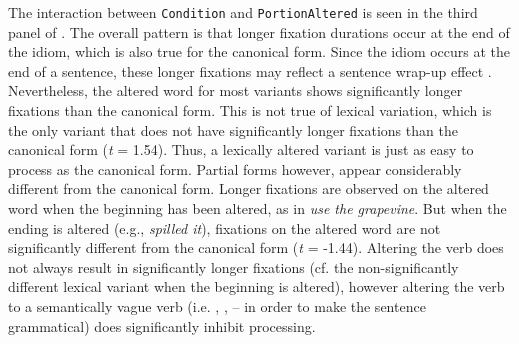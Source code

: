 \documentclass[output=paper,modfonts,nonflat]{langsci/langscibook}
\begin{document}
The interaction between \texttt{Condition} and \texttt{PortionAltered} is seen in the third panel of . The overall pattern is that longer fixation durations occur at the end of the idiom, which is also true for the canonical form. Since the idiom occurs at the end of a sentence, these longer fixations may reflect a sentence wrap-up effect \citep{RaynerEtAl2000, HirotaniEtAl2006}. Nevertheless, the altered word for most variants shows significantly longer fixations than the canonical form. This is not true of lexical variation, which is the only variant that does not have significantly longer fixations than the canonical form (\textit{t} = 1.54). Thus, a lexically altered variant is just as easy to process as the canonical form. Partial forms however, appear considerably different from the canonical form. Longer fixations are observed on the altered word when the beginning has been altered, as in \textit{use the grapevine}. But when the ending is altered (e.g., \textit{spilled it}), fixations on the altered word are not significantly different from the canonical form (\textit{t} = -1.44). 
Altering the verb does not always result in significantly longer fixations (cf. the non-significantly different lexical variant when the beginning is altered),
however altering the verb to a semantically vague verb (i.e. , ,  – in order to make the sentence grammatical) does significantly inhibit processing.
\end{document}
